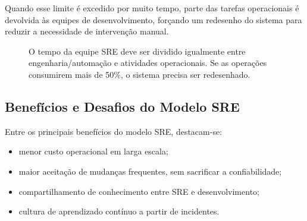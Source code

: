 \documentclass[12pt,a4paper]{report}
\begin{document}
Quando esse limite é excedido por muito tempo, parte das tarefas operacionais
é devolvida às equipes de desenvolvimento, forçando um redesenho do sistema
para reduzir a necessidade de intervenção manual.

\begin{figure}[h]
    \centering
    \caption{O tempo da equipe SRE deve ser dividido igualmente entre engenharia/automação e atividades operacionais. Se as operações consumirem mais de 50\%, o sistema precisa ser redesenhado.}
\end{figure}

\subsection{Benefícios e Desafios do Modelo SRE}

Entre os principais benefícios do modelo SRE, destacam-se:
\begin{itemize}[nosep]
    \item menor custo operacional em larga escala;
    \item maior aceitação de mudanças frequentes, sem sacrificar a
    confiabilidade;
    \item compartilhamento de conhecimento entre SRE e desenvolvimento;
    \item cultura de aprendizado contínuo a partir de incidentes.
\end{itemize}
\end{document}
